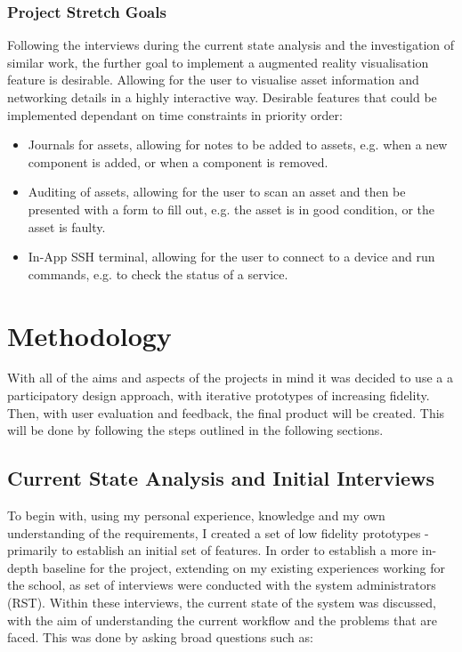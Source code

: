 \documentclass [11pt,a4paper]{article}
\begin{document}
\subsubsection{Project Stretch Goals}
\label{sec:stretchgoals}
Following the interviews during the current state analysis and the investigation of similar work, the further goal to implement a augmented reality visualisation feature is desirable. Allowing for the user to visualise asset information and networking details in a highly interactive way. 
Desirable features that could be implemented dependant on time constraints in priority order: 
\begin{itemize}
\item Journals for assets, allowing for notes to be added to assets, e.g. when a new component is added, or when a component is removed.

\item Auditing of assets, allowing for the user to scan an asset and then be presented with a form to fill out, e.g. the asset is in good condition, or the asset is faulty. 

\item In-App SSH terminal, allowing for the user to connect to a device and run commands, e.g. to check the status of a service.
\end{itemize}

\section{Methodology}
\label{sec:methodology}
With all of the aims and aspects of the projects in mind it was decided to use a a participatory design approach, with iterative prototypes of increasing fidelity. Then, with user evaluation and feedback, the final product will be created. This will be done by following the steps outlined in the following sections.

\subsection{Current State Analysis and Initial Interviews}
\label{sec:current_state_analysis}
To begin with, using my personal experience, knowledge and my own understanding of the requirements, I created a set of low fidelity prototypes - primarily to establish an initial set of features. In order to establish a more in-depth baseline for the project, extending on my existing experiences working for the school, as set of interviews were conducted with the system administrators (RST). Within these interviews, the current state of the system was discussed, with the aim of understanding the current workflow and the problems that are faced. This was done by asking broad questions such as:
\end{document}
